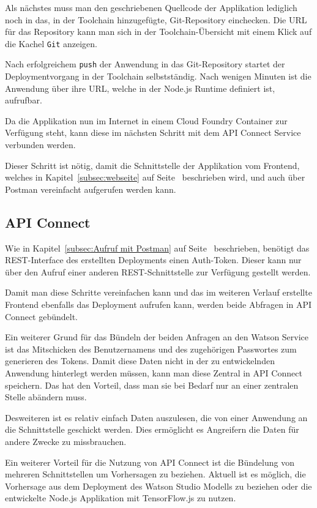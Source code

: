 Als nächstes muss man den geschriebenen Quellcode der Applikation lediglich noch in das, in der Toolchain hinzugefügte,
Git-Repository einchecken. Die URL für das Repository kann man sich in der Toolchain-Übersicht mit einem Klick auf die
Kachel \texttt{Git} anzeigen.

Nach erfolgreichem \texttt{push} der Anwendung in das Git-Repository startet der Deploymentvorgang in der Toolchain
selbstständig. Nach wenigen Minuten ist die Anwendung über ihre URL, welche in der Node.js Runtime definiert ist,
aufrufbar.

Da die Applikation nun im Internet in einem Cloud Foundry Container zur Verfügung steht, kann diese im nächsten Schritt
mit dem API Connect Service verbunden werden.

Dieser Schritt ist nötig, damit die Schnittstelle der Applikation vom Frontend, welches in Kapitel~\ref{subsec:webseite}
auf Seite~\pageref{subsec:webseite} beschrieben wird, und auch über Postman vereinfacht aufgerufen werden kann.

\subsection{API Connect}
\label{subsec:apiconnect}
Wie in Kapitel~\ref{subsec:Aufruf mit Postman} auf Seite~\pageref{subsec:Aufruf mit Postman} beschrieben, benötigt das
REST-Interface des erstellten Deployments einen Auth-Token. Dieser kann nur über den Aufruf einer anderen
REST-Schnittstelle zur Verfügung gestellt werden.

Damit man diese Schritte vereinfachen kann und das im weiteren Verlauf erstellte Frontend ebenfalls das Deployment
aufrufen kann, werden beide Abfragen in API Connect gebündelt.

Ein weiterer Grund für das Bündeln der beiden Anfragen an den Watson Service ist das Mitschicken des Benutzernamens und
des zugehörigen Passwortes zum generieren des Tokens. Damit diese Daten nicht in der zu entwickelnden Anwendung hinterlegt
werden müssen, kann man diese Zentral in API Connect speichern. Das hat den Vorteil, dass man sie bei Bedarf nur an einer
zentralen Stelle abändern muss.

Desweiteren ist es relativ einfach Daten auszulesen, die von einer Anwendung an die Schnittstelle geschickt werden. Dies
ermöglicht es Angreifern die Daten für andere Zwecke zu missbrauchen.

Ein weiterer Vorteil für die Nutzung von API Connect ist die Bündelung von mehreren Schnittstellen um Vorhersagen zu
beziehen. Aktuell ist es möglich, die Vorhersage aus dem Deployment des Watson Studio Modells zu beziehen oder die
entwickelte Node.js Applikation mit TensorFlow.js zu nutzen.


